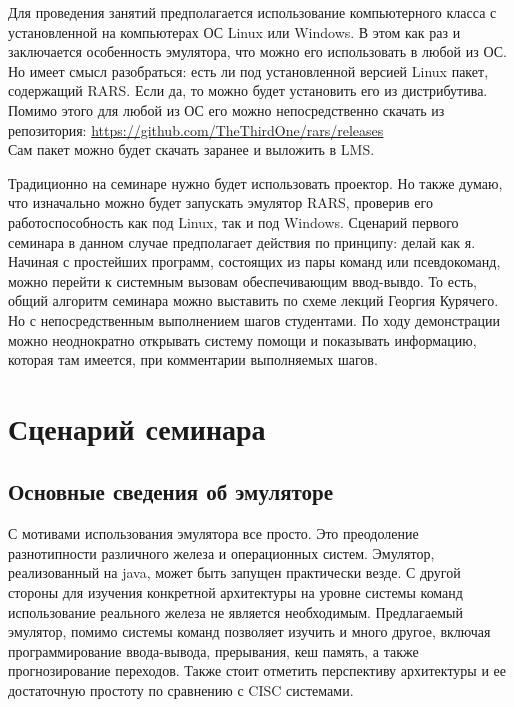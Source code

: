 Для проведения занятий предполагается использование компьютерного класса с установленной на компьютерах ОС Linux или Windows. В этом как раз и заключается особенность эмулятора, что можно его использовать в любой из ОС. Но имеет смысл разобраться: есть ли под установленной версией Linux пакет, содержащий RARS. Если да, то можно будет установить его из дистрибутива. Помимо этого для любой из ОС его можно непосредственно скачать из репозитория: \url{https://github.com/TheThirdOne/rars/releases}\\
Сам пакет можно будет скачать заранее и выложить в LMS.


Традиционно на семинаре нужно будет использовать проектор. Но также думаю, что изначально можно будет запускать эмулятор RARS, проверив его работоспособность как под Linux, так и под Windows. Сценарий первого семинара в данном случае предполагает действия по принципу: делай как я. Начиная с простейших программ, состоящих из пары команд или псевдокоманд, можно перейти к системным вызовам обеспечивающим ввод-вывдо. То есть, общий алгоритм семинара можно выставить по схеме лекций Георгия Курячего. Но с непосредственным выполнением шагов студентами. По ходу демонстрации можно неоднократно открывать систему помощи и показывать информацию, которая там имеется, при комментарии выполняемых шагов.

\section{Сценарий семинара}
\subsection{Основные сведения об эмуляторе}
С мотивами использования эмулятора все просто. Это преодоление разнотипности различного железа и операционных систем. Эмулятор, реализованный на java, может быть запущен практически везде. С другой стороны для изучения конкретной архитектуры на уровне системы команд использование реального железа не является необходимым. Предлагаемый эмулятор, помимо системы команд позволяет изучить и много другое, включая программирование ввода-вывода, прерывания, кеш память, а также прогнозирование переходов. Также стоит отметить перспективу архитектуры и ее достаточную простоту по сравнению с CISC системами.

